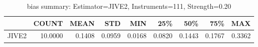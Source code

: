 \begin{table}[ht]
\centering
\caption{bias summary: Estimator=JIVE2, Instruments=111, Strength=0.20}
\begin{tabular}{lrrrrrrrr}
\toprule
 & COUNT & MEAN & STD & MIN & 25\% & 50\% & 75\% & MAX \\
\midrule
JIVE2 & 10.0000 & 0.1408 & 0.0959 & 0.0168 & 0.0820 & 0.1443 & 0.1767 & 0.3362 \\
\bottomrule
\end{tabular}
\end{table}
